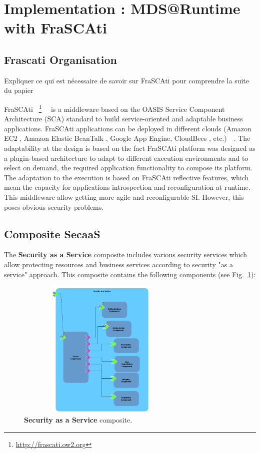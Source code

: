 \documentclass[runningheads,a4paper]{llncs}
\begin{document}
\section{Implementation : MDS@Runtime with FraSCAti}
\subsection{Frascati Organisation}
Expliquer ce qui est n\'ecessaire de savoir sur FraSCAti pour comprendre la suite du papier

FraSCAti ~\footnote{\url{http://frascati.ow2.org}}~\cite{SMF09}~\cite{SMR12} is a middleware based on the OASIS Service Component Architecture (SCA) standard to build service-oriented and adaptable business applications. FraSCAti applications can be deployed in different clouds (Amazon EC2 , Amazon Elastic BeanTalk , Google App Engine, CloudBees , etc.)~\cite{MRS11}~\cite{PHM12}. The adaptability at the design is based on the fact FraSCAti platform was designed as a plugin-based architecture to adapt to different execution environments and to select on demand, the required application functionality to compose its platform. The adaptation to the execution is based on FraSCAti reflective features, which mean the capacity for applications introspection and reconfiguration at runtime. This middleware allow getting more agile and reconfigurable SI. However, this poses obvious security problems.
\subsection{Composite SecaaS}

The \textbf{Security as a Service} composite includes various security services which allow protecting resources and business services according to security "as a service" approach. This composite contains the following components (see Fig.~\ref{fig:SecaaS}):
\begin{figure}[ht]  
\centering
\includegraphics[height=190pt, width=230pt]{Secaas1.PNG}
\caption{\textbf{Security as a Service} composite.}
\label{fig:SecaaS}
\end{figure}
\end{document}
